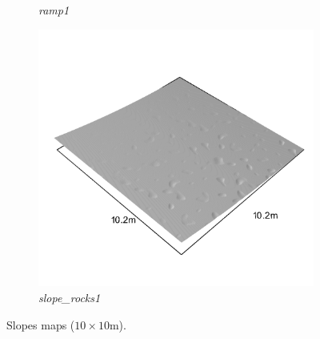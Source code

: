 \documentclass[../document.tex]{subfiles}
\begin{document}
\begin{figure}[H]
\begin{subfigure}[b]{0.32\linewidth}
            \caption{\emph{ramp1}}
            \end{subfigure}    
          \begin{subfigure}[b]{0.32\textwidth}
            \includegraphics[width=\textwidth]{../img/hm3d_borders/slope_rocks1.png}
            \caption{\emph{slope\_rocks1}}
        \end{subfigure}    
    \caption{Slopes maps ($10\times10$m).}
\end{figure}
\end{document}
